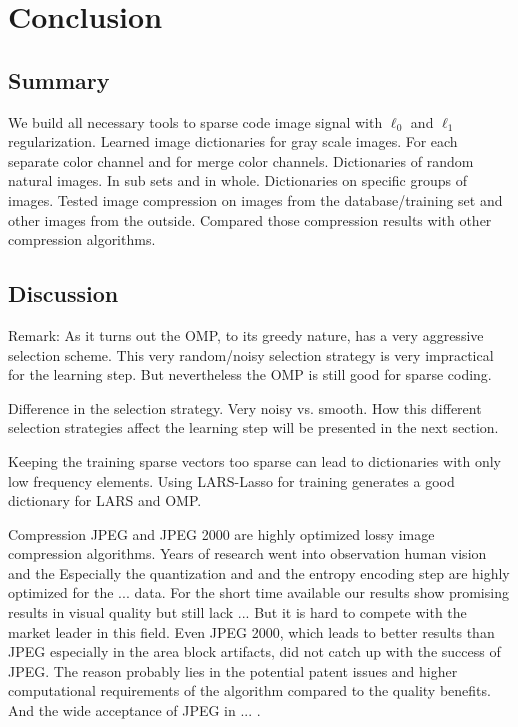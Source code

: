 \chapter{Conclusion}

\section{Summary} %

We build all necessary tools to sparse code image signal with $\ell_0$ and
$\ell_1$ regularization. Learned image dictionaries for gray scale images. For
each separate color channel and for merge color channels. Dictionaries of
random natural images. In sub sets and in whole. Dictionaries on specific
groups of images. Tested image compression on images from the
database/training set and other images from the outside. 
Compared those compression results with other compression algorithms.

\section{Discussion}

Remark:
As it turns out the OMP, to its greedy nature, has a very aggressive selection
scheme. This very random/noisy selection strategy is very impractical
for the \trainDL learning step. But nevertheless the OMP is still good for
sparse coding. 

Difference in the selection strategy.
Very noisy vs. smooth. 
How this different selection strategies affect the learning step will be
presented in the next section.


Keeping the training sparse vectors too sparse can lead to dictionaries with
only low frequency elements. Using LARS-Lasso for training generates a good
dictionary for LARS and OMP. 


Compression 
JPEG and JPEG 2000 are highly optimized lossy image compression algorithms. 
Years of research went into observation human vision and the 
Especially the quantization and and the entropy encoding step are highly
optimized for the ... data.
For the short time available our results show promising results in visual
quality but still lack ...
But it is hard to compete with the market leader in this field.  Even JPEG 2000,
which leads to better results than JPEG especially in the area block artifacts,
did not catch up with the success of JPEG. 
The reason probably lies in the potential patent issues and higher computational
requirements of the algorithm compared
to the quality benefits. And the wide acceptance of JPEG in ...
.


